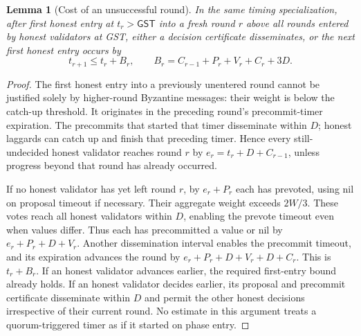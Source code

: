 \documentclass[conference,letterpaper,10pt]{IEEEtran}
\newtheorem{lemma}{Lemma}
\begin{document}
\begin{lemma}[Cost of an unsuccessful round]\label{lem:failed-round}
In the same timing specialization, after first honest entry at $t_r>\mathsf{GST}$ into a fresh round $r$ above all rounds entered by honest validators at GST, either a decision certificate disseminates, or the next first honest entry occurs by
\[
 t_{r+1}\leq t_r+B_r,\qquad
 B_r=C_{r-1}+P_r+V_r+C_r+3D.
\]
\end{lemma}
\begin{proof}
The first honest entry into a previously unentered round cannot be justified solely by higher-round Byzantine messages: their weight is below the catch-up threshold. It originates in the preceding round's precommit-timer expiration. The precommits that started that timer disseminate within $D$; honest laggards can catch up and finish that preceding timer. Hence every still-undecided honest validator reaches round $r$ by $e_r=t_r+D+C_{r-1}$, unless progress beyond that round has already occurred.

If no honest validator has yet left round $r$, by $e_r+P_r$ each has prevoted, using nil on proposal timeout if necessary. Their aggregate weight exceeds $2W/3$. These votes reach all honest validators within $D$, enabling the prevote timeout even when values differ. Thus each has precommitted a value or nil by $e_r+P_r+D+V_r$. Another dissemination interval enables the precommit timeout, and its expiration advances the round by $e_r+P_r+D+V_r+D+C_r$. This is $t_r+B_r$. If an honest validator advances earlier, the required first-entry bound already holds. If an honest validator decides earlier, its proposal and precommit certificate disseminate within $D$ and permit the other honest decisions irrespective of their current round. No estimate in this argument treats a quorum-triggered timer as if it started on phase entry.
\end{proof}
\end{document}
